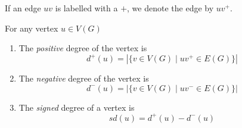 \begin{frame}
    If an edge $uv$ is labelled with a $+$, we denote the edge by $uv^{+}$.
    \begin{definition}
        For any vertex $u \in V(G)$
        \begin{enumerate}
            \item The \textit{positive} degree of the vertex is
            \begin{equation*}
                d^{+}(u) = |\{v \in V(G) \mid uv^+ \in E(G)\}|
            \end{equation*}
            \item The \textit{negative} degree of the vertex is
            \begin{equation*}
                d^{-}(u) = |\{v \in V(G) \mid uv^- \in E(G)\}|
            \end{equation*}
            \item The \textit{signed} degree of a vertex is
            \begin{equation*}
                sd(u) = d^+(u) - d^-(u)
            \end{equation*}
        \end{enumerate}
    \end{definition}
\end{frame}

